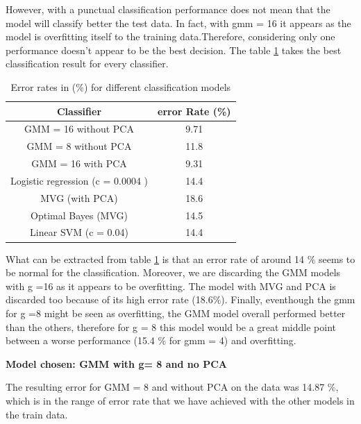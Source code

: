 \documentclass[twoside,a4paper,12pt]{report}
\begin{document}
However, with a punctual classification performance does not mean that the model
will classify better the test data. In fact, with gmm = 16 it appears as 
the model is overfitting itself to the training data.Therefore, considering 
only one performance doesn't appear to be the best decision. The table \ref{errorRatesModels}
takes the best classification result for every classifier.

\begin{table}[H]
    \centering
     \begin{tabular}{||c c ||} 
        \hline \hline
        Classifier & error Rate (\%) \\
        \hline\hline
        GMM = 16 without PCA &  9.71   \\ 
        \hline
        GMM = 8 without PCA &  11.8  \\ 
        \hline
        GMM = 16 with PCA &  9.31    \\
        \hline
        Logistic regression (c = 0.0004 ) &  14.4   \\
        \hline
        MVG (with PCA)  &  18.6 \\
        \hline
        Optimal Bayes (MVG) & 14.5  \\
        \hline
        Linear SVM (c = 0.04)& 14.4  \\
        \hline \hline
    \end{tabular}
    \caption{Error rates in (\%) for different classification models    \label{errorRatesModels}    }
\end{table}

What can be extracted from table \ref{errorRatesModels} is that an error rate of 
around 14 \% seems to be normal for the classification. Moreover, we are
discarding the GMM models with g =16 as it appears to be overfitting. 
The model with MVG and PCA is discarded too because of its high error rate (18.6\%). Finally,
eventhough the gmm for g =8 might be seen as overfitting, the GMM model overall performed
better than the others, therefore for g = 8 this model would be a great middle point
between a worse performance (15.4 \% for gmm = 4) and overfitting. 


\textbf{Model chosen: GMM with g= 8 and no PCA}

The resulting error for GMM = 8 and without PCA on the data was 14.87 \%, which
is in the range of error rate that we have achieved with the other models in
the train data.
\end{document}
